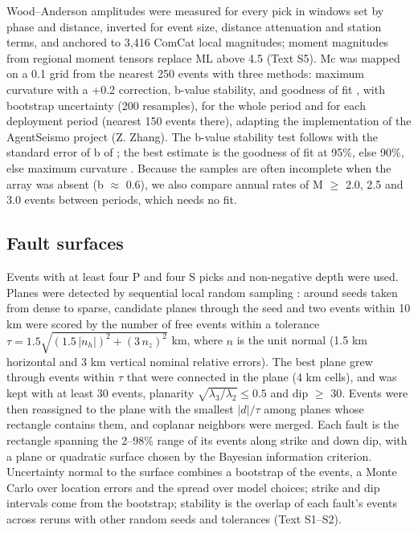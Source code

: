 \documentclass[11pt]{article}
\begin{document}
Wood--Anderson amplitudes were measured for every pick in windows set by
phase and distance, inverted for event size, distance attenuation and
station terms, and anchored to 3,416 ComCat local magnitudes; moment
magnitudes from regional moment tensors replace ML above 4.5 (Text S5).
Mc was mapped on a 0.1\textdegree{} grid from the nearest 250 events with three
methods: maximum curvature with a +0.2 correction, b-value stability,
and goodness of fit \citep{Wiemer2000, Cao2002, Woessner2005}, with
bootstrap uncertainty (200 resamples), for the whole period and for each
deployment period (nearest 150 events there), adapting the
implementation of the AgentSeismo project (Z. Zhang). The b-value
stability test follows \citet{Woessner2005} with the standard error of b
of \citet{Shi1982}; the best estimate is the goodness of fit at 95\%,
else 90\%, else maximum curvature \citep{Mignan2012}. Because the
samples are often incomplete when the array was absent (b \ensuremath{\approx} 0.6), we
also compare annual rates of M \ensuremath{\geq} 2.0, 2.5 and 3.0 events between
periods, which needs no fit.

\subsection{Fault surfaces}\label{fault-surfaces}

Events with at least four P and four S picks and non-negative depth were
used. Planes were detected by sequential local random sampling
\citep{Fischler1981}: around seeds taken from dense to sparse, candidate
planes through the seed and two events within 10 km were scored by the
number of free events within a tolerance
\(\tau = 1.5\sqrt{(1.5\,|n_h|)^2 + (3\,n_z)^2}\) km, where \(n\) is the
unit normal (1.5 km horizontal and 3 km vertical nominal relative
errors). The best plane grew through events within \(\tau\) that were
connected in the plane (4 km cells), and was kept with at least 30
events, planarity \(\sqrt{\lambda_3/\lambda_2} \le 0.5\) and dip \ensuremath{\geq} 30\textdegree{}.
Events were then reassigned to the plane with the smallest \(|d|/\tau\)
among planes whose rectangle contains them, and coplanar neighbors were
merged. Each fault is the rectangle spanning the 2--98\% range of its
events along strike and down dip, with a plane or quadratic surface
chosen by the Bayesian information criterion. Uncertainty normal to the
surface combines a bootstrap of the events, a Monte Carlo over location
errors and the spread over model choices; strike and dip intervals come
from the bootstrap; stability is the overlap of each fault's events
across reruns with other random seeds and tolerances (Text S1--S2).
\end{document}
